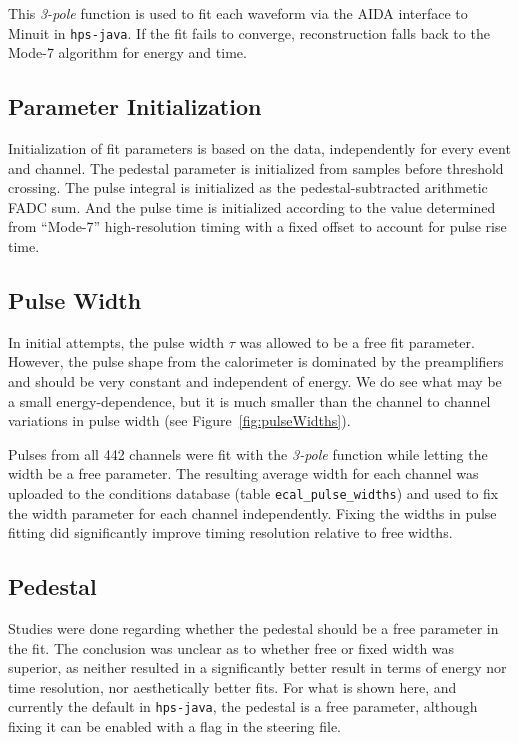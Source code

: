 \documentclass[amsmath,amssymb,notitlepage,12pt]{revtex4-1}
\begin{document}
This {\em 3-pole} function is used to fit each waveform via the AIDA interface to Minuit in \texttt{hps-java}.  If the fit fails to converge, reconstruction falls back to the Mode-7 algorithm for energy and time.

\subsection{Parameter Initialization}
Initialization of fit parameters is based on the data, independently for every event and channel. 
The pedestal parameter is initialized from samples before threshold crossing.
The pulse integral is initialized as the pedestal-subtracted arithmetic FADC sum.
And the pulse time is initialized according to the value determined from ``Mode-7'' high-resolution timing with a fixed offset to account for pulse rise time.

\subsection{Pulse Width}
In initial attempts, the pulse width $\tau$ was allowed to be a free fit parameter.  However, the pulse shape from the calorimeter is dominated by the preamplifiers and should be very constant and independent of energy.
We do see what may be a small energy-dependence, but it is much smaller than the channel to channel variations in pulse width (see Figure~\ref{fig:pulseWidths}).

Pulses from all 442 channels were fit with the {\em 3-pole} function while letting the width be a free parameter.
The resulting average width for each channel was uploaded to the conditions database (table \texttt{ecal\_pulse\_widths}) and used to fix the width parameter for each channel independently.  Fixing the widths in pulse fitting did significantly improve timing resolution relative to free widths.

\subsection{Pedestal}
Studies were done regarding whether the pedestal should be a free parameter in the fit.  The conclusion was unclear as to whether free or fixed width was superior, as neither resulted in a significantly better result in terms of energy nor time resolution, nor aesthetically better fits.  For what is shown here, and currently the default in \texttt{hps-java}, the pedestal is a free parameter, although fixing it can be enabled with a flag in the steering file.
\end{document}
